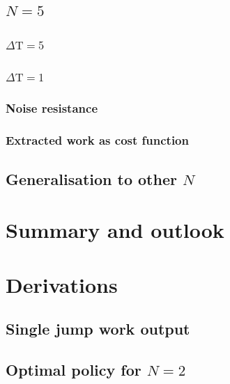 \section{$N=5$}\label{n5}
\subsection{$\Delta \mathrm{T} = 5$}\label{n_5_ml}


\subsection{$\Delta \mathrm{T} = 1$}\label{n_5_dt1}


\subsection{Noise resistance}


\subsection{Extracted work as cost function}\label{work_cost}


\section{Generalisation to other $N$}
 

\chapter{Summary and outlook}\label{outlook}





\appendix
\chapter{Derivations}
\section{Single jump work output}
 \label{deriv_jump}

\section{Optimal policy for $N=2$} \label{n2_opt_pol}

